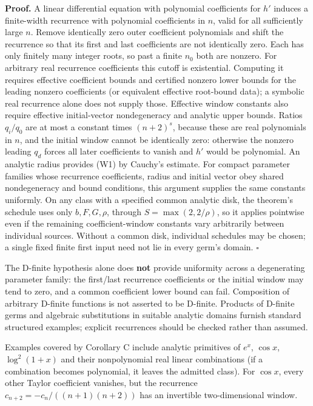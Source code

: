 \documentclass[11pt,a4paper]{article}
\begin{document}
\textbf{Proof.} A linear differential equation with polynomial
coefficients for \(h'\) induces a finite-width recurrence with
polynomial coefficients in \(n\), valid for all sufficiently large
\(n\). Remove identically zero outer coefficient polynomials and shift
the recurrence so that its first and last coefficients are not
identically zero. Each has only finitely many integer roots, so past a
finite \(n_0\) both are nonzero. For arbitrary real recurrence
coefficients this cutoff is existential. Computing it requires effective
coefficient bounds and certified nonzero lower bounds for the leading
nonzero coefficients (or equivalent effective root-bound data); a
symbolic real recurrence alone does not supply those. Effective window
constants also require effective initial-vector nondegeneracy and
analytic upper bounds. Ratios \(q_i/q_0\) are at most a constant times
\((n+2)^s\), because these are real polynomials in \(n\), and the
initial window cannot be identically zero: otherwise the nonzero leading
\(q_d\) forces all later coefficients to vanish and \(h'\) would be
polynomial. An analytic radius provides (W1) by Cauchy's estimate. For
compact parameter families whose recurrence coefficients, radius and
initial vector obey shared nondegeneracy and bound conditions, this
argument supplies the same constants uniformly. On any class with a
specified common analytic disk, the theorem's schedule uses only
\(b,F,G,\rho\), through \(S=\max(2,2/\rho)\), so it applies pointwise
even if the remaining coefficient-window constants vary arbitrarily
between individual sources. Without a common disk, individual schedules
may be chosen; a single fixed finite first input need not lie in every
germ's domain. \(\square\)

The D-finite hypothesis alone does \textbf{not} provide uniformity
across a degenerating parameter family: the first/last recurrence
coefficients or the initial window may tend to zero, and a common
coefficient lower bound can fail. Composition of arbitrary D-finite
functions is not asserted to be D-finite. Products of D-finite germs and
algebraic substitutions in suitable analytic domains furnish standard
structured examples; explicit recurrences should be checked rather than
assumed.

Examples covered by Corollary C include analytic primitives of \(e^x\),
\(\cos x\), \(\log^2(1+x)\) and their nonpolynomial real linear
combinations (if a combination becomes polynomial, it leaves the
admitted class). For \(\cos x\), every other Taylor coefficient
vanishes, but the recurrence \(c_{n+2}=-c_n/((n+1)(n+2))\) has an
invertible two-dimensional window.
\end{document}
